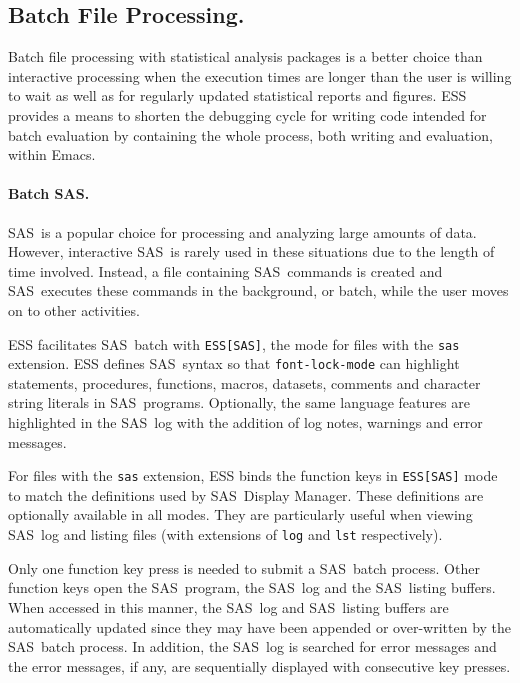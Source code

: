 \documentclass{article}
\newcommand*{\SAS}{\textsc{SAS}}
\newcommand{\stexttt}[1]{{\small\texttt{#1}}}
\begin{document}
\subsection{Batch File Processing.}
\label{sec:batch-file}

Batch file processing with statistical analysis packages is a better
choice than interactive processing when the execution times are longer
than the user is willing to wait as well as for regularly updated
statistical reports and figures.  ESS provides a means to shorten the
debugging cycle for writing code intended for batch evaluation by
containing the whole process, both writing and evaluation, within
Emacs.

\paragraph{Batch \SAS.}
\label{sec:sas-batch}

\SAS\ is a popular choice for processing and analyzing large amounts
of data.  However, interactive \SAS\ is rarely used in these situations
due to the length of time involved.  Instead, a file containing \SAS\
commands is created and \SAS\ executes these commands in the background,
or batch, while the user moves on to other activities.

ESS facilitates \SAS\ batch with \stexttt{ESS[SAS]}, the mode for files
with the \stexttt{sas} extension.  ESS defines \SAS\ syntax so that
\stexttt{font-lock-mode} can highlight statements, procedures,
functions, macros, datasets, comments and character string literals in
\SAS\ programs.  Optionally, the same language features are
highlighted in the \SAS\ log with the addition of log notes, warnings
and error messages.

For files with the \stexttt{sas} extension, ESS binds the function
keys in \stexttt{ESS[SAS]} mode to match the definitions used by \SAS\
Display Manager.  These definitions are optionally available in all
modes.  They are particularly useful when viewing \SAS\ log and
listing files (with extensions of \stexttt{log} and \stexttt{lst}
respectively).

Only one function key press is needed to submit a \SAS\ batch process.
Other function keys open the \SAS\ program, the \SAS\ log and the
\SAS\ listing buffers.  When accessed in this manner, the \SAS\ log
and \SAS\ listing buffers are automatically updated since they may
have been appended or over-written by the \SAS\ batch process.  In
addition, the \SAS\ log is searched for error messages and the error
messages, if any, are sequentially displayed with consecutive key
presses.
\end{document}
